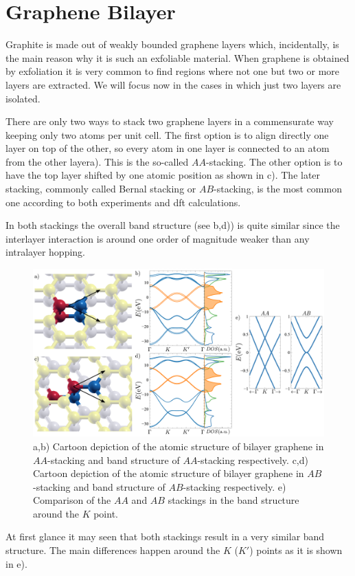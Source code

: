\chapter{Graphene Bilayer}
\label{ch:bilayer}
Graphite is made out of weakly bounded graphene layers which, incidentally, is the main reason why it is such an exfoliable material. When graphene is obtained by exfoliation it is very common to find regions where not one but two or more layers are extracted. We will focus now in the cases in which just two layers are isolated.

There are only two ways to stack two graphene layers in a commensurate way keeping only two atoms per unit cell. The first option is to align directly one layer on top of the other, so every atom in one layer is connected to an atom from the other layera). This is the so-called $AA$-stacking.
The other option is to have the top layer shifted by one atomic position as shown in c). The later stacking, commonly called Bernal stacking or $AB$-stacking, is the most common one according to both experiments and \ac{dft} calculations\cite{Norimatsu2010,Charlier1994,Charlier1994a}.

In both stackings the overall band structure (see b,d)) is quite similar since the interlayer interaction is around one order of magnitude weaker than any intralayer hopping.
\begin{figure}[h!]
\centering
\includegraphics{graphene_bilayer/figures/bilayer_stackings.pdf}
\vspace{-10pt}
\caption{a,b) Cartoon depiction of the atomic structure of bilayer graphene in $AA$-stacking and band structure of $AA$-stacking respectively. c,d) Cartoon depiction of the atomic structure of bilayer graphene in $AB$-stacking and band structure of $AB$-stacking respectively. e) Comparison of the $AA$ and $AB$ stackings in the band structure around the $K$ point.}
\label{Gbi_stack}
\end{figure}
At first glance it may seen that both stackings result in a very similar band structure. The main differences happen around the $K$ ($K'$) points as it is shown in e).

